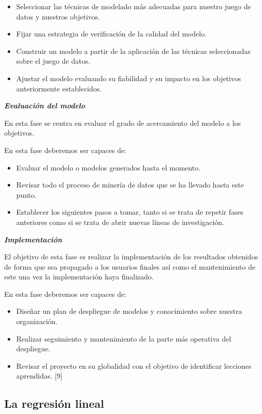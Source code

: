 \documentclass[
]{article}
\providecommand{\tightlist}{%
  \setlength{\itemsep}{0pt}\setlength{\parskip}{0pt}}
\begin{document}
\begin{itemize}
\tightlist
\item
  Seleccionar las técnicas de modelado más adecuadas para nuestro juego
  de datos y nuestros objetivos.
\item
  Fijar una estrategia de verificación de la calidad del modelo.
\item
  Construir un modelo a partir de la aplicación de las técnicas
  seleccionadas sobre el juego de datos.
\item
  Ajustar el modelo evaluando su fiabilidad y su impacto en los
  objetivos anteriormente establecidos.
\end{itemize}

\textbf{\emph{Evaluación del modelo}}

En esta fase se centra en evaluar el grado de acercamiento del modelo a
los objetivos.

En esta fase deberemos ser capaces de:

\begin{itemize}
\tightlist
\item
  Evaluar el modelo o modelos generados hasta el momento.
\item
  Revisar todo el proceso de minería de datos que se ha llevado hasta
  este punto.
\item
  Establecer los siguientes pasos a tomar, tanto si se trata de repetir
  fases anteriores como si se trata de abrir nuevas líneas de
  investigación.
\end{itemize}

\textbf{\emph{Implementación}}

El objetivo de esta fase es realizar la implementación de los resultados
obtenidos de forma que sea propagado a los usuarios finales así como el
mantenimiento de este una vez la implementación haya finalizado.

En esta fase deberemos ser capaces de:

\begin{itemize}
\tightlist
\item
  Diseñar un plan de despliegue de modelos y conocimiento sobre nuestra
  organización.
\item
  Realizar seguimiento y mantenimiento de la parte más operativa del
  despliegue.
\item
  Revisar el proyecto en su globalidad con el objetivo de identiﬁcar
  lecciones aprendidas. {[}9{]}
\end{itemize}

\hypertarget{la-regresiuxf3n-lineal}{%
\subsection{La regresión lineal}\label{la-regresiuxf3n-lineal}}
\end{document}
